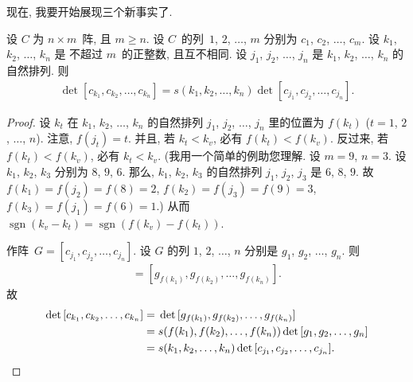 \TheoremColumnSwapAndSign*

现在, 我要开始展现三个新事实了.

\begin{theorem}
    设 \(C\) 为 \(n \times m\)~阵,
    且 \(m \geq n\).
    设 \(C\)~的列~\(1\), \(2\), \(\dots\), \(m\)
    分别为 \(c_1\), \(c_2\), \(\dots\), \(c_m\).
    设 \(k_1\), \(k_2\), \(\dots\), \(k_n\) 是%
    不超过 \(m\)~的正整数,
    且互不相同.
    设 \(j_1\), \(j_2\), \(\dots\), \(j_n\) 是
    \(k_1\), \(k_2\), \(\dots\), \(k_n\) 的自然排列.
    则
    \begin{align*}
        \det {[c_{k_1}, c_{k_2}, \dots, c_{k_n}]}
        = s(k_1, k_2, \dots, k_n)
        \det {[c_{j_1}, c_{j_2}, \dots, c_{j_n}]}.
    \end{align*}
\end{theorem}

\begin{proof}
    设 \(k_t\) 在 \(k_1\), \(k_2\), \(\dots\), \(k_n\)
    的自然排列
    \(j_1\), \(j_2\), \(\dots\), \(j_n\)
    里的位置为 \(f(k_t)\)
    (\(t = 1\), \(2\), \(\dots\), \(n\)).
    注意, \(f(j_t) = t\).
    并且, 若 \(k_t < k_v\), 必有 \(f(k_t) < f(k_v)\).
    反过来, 若 \(f(k_t) < f(k_v)\), 必有 \(k_t < k_v\).
    (我用一个简单的例助您理解.
    设 \(m = 9\), \(n = 3\).
    设 \(k_1\), \(k_2\), \(k_3\) 分别为 \(8\), \(9\), \(6\).
    那么, \(k_1\), \(k_2\), \(k_3\) 的自然排列
    \(j_1\), \(j_2\), \(j_3\)
    是
    \(6\), \(8\), \(9\).
    故 \(f(k_1) = f(j_2) = f(8) = 2\),
    \(f(k_2) = f(j_3) = f(9) = 3\),
    \(f(k_3) = f(j_1) = f(6) = 1\).)
    从而
    \(\operatorname{sgn} {(k_v - k_t)}
    = \operatorname{sgn} {(f(k_v) - f(k_t))}\).

    作阵~\(G = [c_{j_1}, c_{j_2}, \dots, c_{j_n}]\).
    设 \(G\) 的列
    \(1\), \(2\), \(\dots\), \(n\)
    分别是
    \(g_1\), \(g_2\), \(\dots\), \(g_n\).
    则
    \begin{align*}
        [c_{k_1}, c_{k_2}, \dots, c_{k_n}]
        = [g_{f(k_1)}, g_{f(k_2)}, \dots, g_{f(k_n)}].
    \end{align*}
    故
    \begin{align*}
        \det {[c_{k_1}, c_{k_2}, \dots, c_{k_n}]}
        = {} &
        \det {[g_{f(k_1)}, g_{f(k_2)}, \dots, g_{f(k_n)}]}
        \\
        = {} &
        s(f(k_1), f(k_2), \dots, f(k_n))
        \det {[g_1, g_2, \dots, g_n]}
        \\
        = {} &
        s(k_1, k_2, \dots, k_n)
        \det {[c_{j_1}, c_{j_2}, \dots, c_{j_n}]}.
        \qedhere
    \end{align*}
\end{proof}

